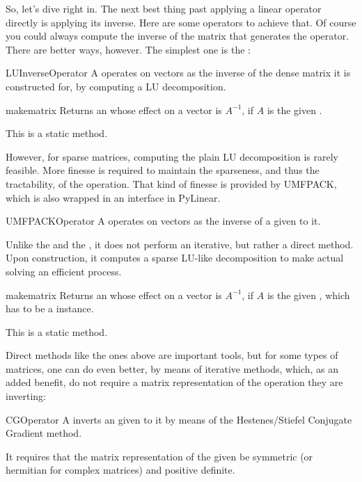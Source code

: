 So, let's dive right in. The next best thing past applying a linear
operator directly is applying its inverse. Here are some operators to
achieve that. Of course you could always compute the inverse of the
matrix that generates the operator. There are better ways,
however. The simplest one is the :
\begin{classdesc*}{LUInverseOperator}
  A  operates on vectors as the inverse of
  the dense matrix it is constructed for, by computing a LU 
  decomposition.
\end{classdesc*}
\begin{methoddesc}{make}{matrix}
  Returns an  whose effect on a vector is $A^{-1}$,
  if $A$ is the given .

  This is a static method.
\end{methoddesc}
However, for sparse matrices, computing the plain LU decomposition is
rarely feasible. More finesse is required to maintain the sparseness,
and thus the tractability, of the operation. That kind of finesse is
provided by UMFPACK, which is also wrapped in an 
interface in PyLinear.
\begin{classdesc*}{UMFPACKOperator}
  A  operates on vectors as the inverse of a
   given to it.

  Unlike the  and the ,
  it does not perform an iterative, but rather a direct method.
  Upon construction, it computes a sparse LU-like decomposition 
  to make actual solving an efficient process.
\end{classdesc*}
\begin{methoddesc}{make}{matrix}
  Returns an  whose effect on a vector is $A^{-1}$,
  if $A$ is the given , which has to be a 
   instance.

  This is a static method.
\end{methoddesc}
Direct methods like the ones above are important tools, but for some
types of matrices, one can do even better, by means of iterative methods,
which, as an added benefit, do not require a matrix representation of
the operation they are inverting:
\begin{classdesc*}{CGOperator}
  A  inverts an  given to it
  by means of the Hestenes/Stiefel Conjugate Gradient method.

  It requires that the matrix representation of the given 
   be symmetric (or hermitian for complex matrices) 
  and positive definite.
\end{classdesc*}
